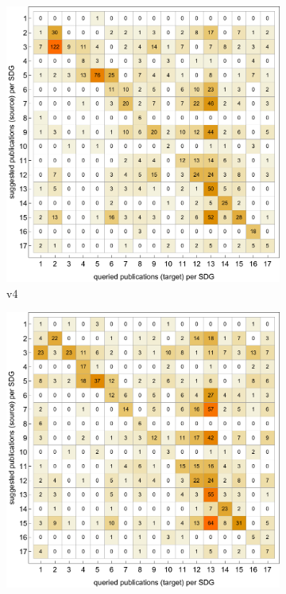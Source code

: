 \documentclass{article}
\begin{document}
\begin{figure}[H]
    \centering
         \begin{subfigure}{0.49\textwidth}
                     \centering
            \includegraphics[width=\textwidth]{figures/recallmatrixv4.pdf}
            \caption{v4}
            \label{subfig1}
        \end{subfigure}
             \hfill
         \begin{subfigure}{0.49\textwidth}
                     \centering
            \includegraphics[width=\textwidth]{figures/recallmatrixv5.pdf}

\end{subfigure}
\end{figure}
\end{document}
